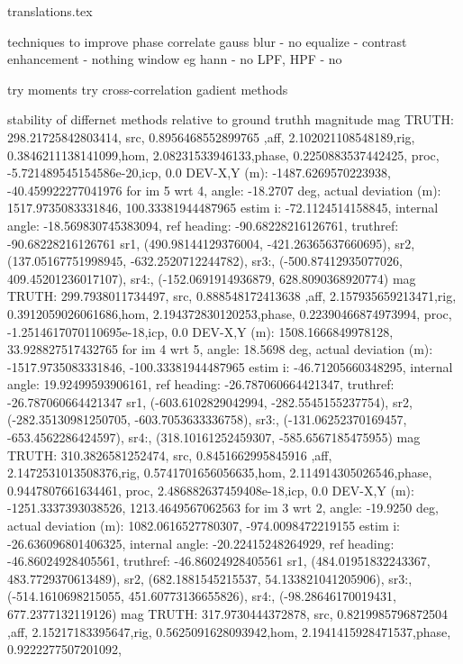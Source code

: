 translations.tex

techniques to improve phase correlate
gauss blur - no 
equalize - contrast enhancement - nothing
window eg hann - no
LPF, HPF - no


try moments
try cross-correlation
gadient methods

stability of differnet methods relative to ground truthh magnitude 
mag TRUTH: 298.21725842803414, src, 0.8956468552899765 ,aff, 2.102021108548189,rig, 0.3846211138141099,hom, 2.08231533946133,phase, 0.2250883537442425, 
proc, -5.721489545154586e-20,icp, 0.0
DEV-X,Y (m): -1487.6269570223938, -40.459922277041976  for im 5 wrt 4, angle: -18.2707 deg, actual deviation (m): 1517.9735083331846, 100.33381944487965
estim i: -72.1124514158845, internal angle: -18.569830745383094, ref heading: -90.68228216126761, truthref: -90.68228216126761
sr1, (490.98144129376004, -421.26365637660695), sr2, (137.05167751998945, -632.2520712244782), sr3:, (-500.87412935077026, 409.45201236017107), sr4:, (-152.0691914936879, 628.8090368920774)
mag TRUTH: 299.7938011734497, src, 0.888548172413638 ,aff, 2.157935659213471,rig, 0.3912059026061686,hom, 2.194372830120253,phase, 0.22390466874973994, 
proc, -1.2514617070110695e-18,icp, 0.0
DEV-X,Y (m): 1508.1666849978128, 33.928827517432765  for im 4 wrt 5, angle: 18.5698 deg, actual deviation (m): -1517.9735083331846, -100.33381944487965
estim i: -46.71205660348295, internal angle: 19.92499593906161, ref heading: -26.787060664421347, truthref: -26.787060664421347
sr1, (-603.6102829042994, -282.5545155237754), sr2, (-282.35130981250705, -603.7053633336758), sr3:, (-131.06252370169457, -653.4562286424597), sr4:, (318.10161252459307, -585.6567185475955)
mag TRUTH: 310.3826581252474, src, 0.8451662995845916 ,aff, 2.1472531013508376,rig, 0.5741701656056635,hom, 2.114914305026546,phase, 0.9447807661634461, 
proc, 2.486882637459408e-18,icp, 0.0
DEV-X,Y (m): -1251.3337393038526, 1213.4649567062563  for im 3 wrt 2, angle: -19.9250 deg, actual deviation (m): 1082.0616527780307, -974.0098472219155
estim i: -26.636096801406325, internal angle: -20.22415248264929, ref heading: -46.86024928405561, truthref: -46.86024928405561
sr1, (484.01951832243367, 483.7729370613489), sr2, (682.1881545215537, 54.133821041205906), sr3:, (-514.1610698215055, 451.60773136655826), sr4:, (-98.28646170019431, 677.2377132119126)
mag TRUTH: 317.9730444372878, src, 0.8219985796872504 ,aff, 2.15217183395647,rig, 0.5625091628093942,hom, 2.1941415928471537,phase, 0.9222277507201092,